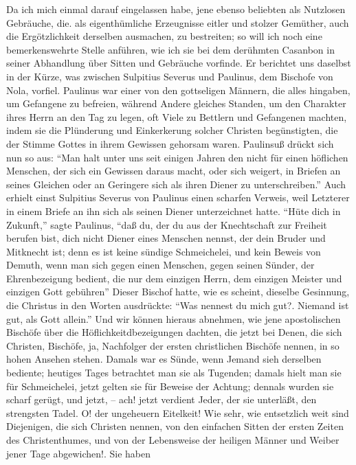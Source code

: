 Da ich mich einmal darauf eingelassen habe, jene ebenso beliebten als Nutzlosen
Gebräuche, die. als eigenthümliche Erzeugnisse eitler und stolzer Gemüther, auch
die Ergötzlichkeit derselben ausmachen, zu bestreiten; so will ich noch eine
bemerkenswehrte Stelle anführen, wie ich sie bei dem derühmten Casanbon in
seiner Abhandlung über Sitten und Gebräuche vorfinde. Er berichtet uns daselbst
in der Kürze, was zwischen Sulpitius Severus und Paulinus, dem Bischofe von
Nola, vorfiel. Paulinus war einer von den gottseligen Männern, die alles
hingaben, um Gefangene zu befreien, während Andere gleiches Standen, um den
Charakter ihres Herrn an den Tag zu legen, oft Viele zu Bettlern und Gefangenen
machten, indem sie die Plünderung und Einkerkerung solcher Christen
begünstigten, die der Stimme Gottes in ihrem Gewissen gehorsam waren. Paulinsuß
drückt sich nun so aus: "`Man halt unter uns seit einigen Jahren den nicht für
einen höflichen Menschen, der sich ein Gewissen daraus macht, oder sich weigert,
in Briefen an seines Gleichen oder an Geringere sich als ihren Diener zu
unterschreiben."' Auch erhielt einst Sulpitius Severus von Paulinus einen
scharfen Verweis, weil Letzterer in einem Briefe an ihn sich als seinen Diener
unterzeichnet hatte. "`Hüte dich in Zukunft,"' sagte Paulinus, "`daß du, der du
aus der Knechtschaft zur Freiheit berufen bist, dich nicht Diener eines Menschen
nennst, der dein Bruder und Mitknecht ist; denn es ist keine sündige
Schmeichelei, und kein Beweis von Demuth, wenn man sich gegen einen Menschen,
gegen seinen Sünder, der Ehrenbezeigung bedient, die nur dem einzigen Herrn, dem
einzigen Meister und einzigen Gott gebühren"' Dieser Bischof hatte, wie es
scheint, dieselbe Gesinnung, die Christus in den Worten ausdrückte: "`Was
nennest du mich gut?. Niemand ist gut, als Gott allein."' Und wir können hieraus
abnehmen, wie jene apostolischen Bischöfe über die Höflichkeitdbezeigungen
dachten, die jetzt bei Denen, die sich Christen, Bischöfe, ja, Nachfolger der
ersten christlichen Bischöfe nennen, in so hohen Ansehen stehen. Damals war es
Sünde, wenn Jemand sieh derselben bediente; heutiges Tages betrachtet man sie
als Tugenden; damals hielt man sie für Schmeichelei, jetzt gelten sie für
Beweise der Achtung; dennals wurden sie scharf gerügt, und jetzt, -- ach! jetzt
verdient Jeder, der sie unterläßt, den strengsten Tadel. O! der ungeheuern
Eitelkeit! Wie sehr, wie entsetzlich weit sind Diejenigen, die sich Christen
nennen, von den einfachen Sitten der ersten Zeiten des Christenthumes, und von
der Lebensweise der heiligen Männer und Weiber jener Tage abgewichen!. Sie haben
